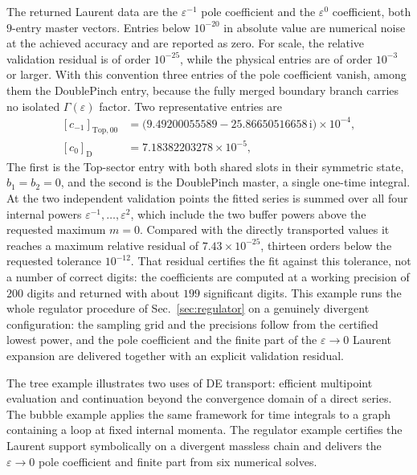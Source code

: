 \documentclass[11pt,a4paper]{article}
\newcommand{\ii}{\mathrm i}
\begin{document}
The returned Laurent data are the $\varepsilon^{-1}$ pole coefficient and the
$\varepsilon^0$ coefficient, both $9$-entry master vectors. Entries below $10^{-20}$ in
absolute value are numerical noise at the achieved accuracy and are reported as zero. For scale,
the relative validation residual is of order $10^{-25}$, while the physical entries are of order
$10^{-3}$ or larger. With this convention three entries of the pole coefficient vanish,
among them the DoublePinch entry, because the fully merged boundary branch carries no
isolated $\Gamma(\varepsilon)$ factor. Two representative entries are
\begin{equation}
  \begin{aligned}
  [c_{-1}]_{\mathrm{Top},00}&=\bigl(9.49200055589-25.86650516658\,\ii\bigr)\times10^{-4},\\
  [c_0]_{\mathrm{D}}&=7.18382203278\times10^{-5},
  \end{aligned}
  \label{eq:ep-finite-entries}
\end{equation}
The first is the Top-sector entry with both shared slots in their symmetric state, $b_1=b_2=0$,
and the second is the DoublePinch master, a single one-time integral. At the two independent
validation points the fitted series is summed over all four internal powers
$\varepsilon^{-1},\ldots,\varepsilon^{2}$, which include the two buffer powers above the requested
maximum $m=0$. Compared with the directly transported values it reaches a maximum relative residual
of $7.43\times10^{-25}$, thirteen orders below the requested tolerance $10^{-12}$. That residual
certifies the fit against this tolerance, not a number of correct digits: the coefficients are computed
at a working precision of $200$ digits and returned with about $199$ significant digits. This example
runs the whole regulator procedure of Sec.~\ref{sec:regulator} on a genuinely divergent
configuration: the sampling grid and the precisions follow from the certified lowest power, and the
pole coefficient and the finite part of the $\varepsilon\to0$ Laurent expansion are delivered
together with an explicit validation residual.

The tree example illustrates two uses of DE transport: efficient multipoint
evaluation and continuation beyond the convergence domain of a direct series.
The bubble example applies the same framework for time integrals to a graph
containing a loop at fixed internal momenta.
The regulator example certifies the Laurent support symbolically on a divergent
massless chain and delivers the $\varepsilon\to0$ pole coefficient and finite part from six
numerical solves.
\end{document}

